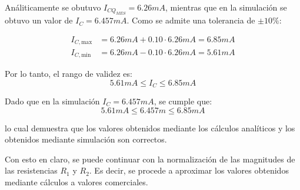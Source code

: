 Análiticamente se obutuvo $I_{CQ_{MES}} = 6.26mA$, mientras que en la simulación se obtuvo un valor de $I_C = 6.457mA$.
Como se admite una tolerancia de $\pm 10\%$:

\begin{align*}
I_{C,\text{max}} &= 6.26mA + 0.10 \cdot 6.26mA = 6.85mA \\
I_{C,\text{min}} &= 6.26mA - 0.10 \cdot 6.26mA = 5.61mA
\end{align*}

Por lo tanto, el rango de validez es:
\[
5.61mA \leq I_C \leq 6.85mA
\]

Dado que en la simulación $I_C = 6.457mA$, se cumple que:
\[
5.61mA \leq 6.457m \leq 6.85mA
\]

lo cual demuestra que los valores obtenidos mediante los cálculos analíticos y los 
obtenidos mediante simulación son correctos.

Con esto en claro, se puede continuar con la normalización de las magnitudes
de las resistencias $R_1$ y $R_2$. Es decir, se procede a aproximar los valores obtenidos 
mediante cálculos a valores comerciales.
